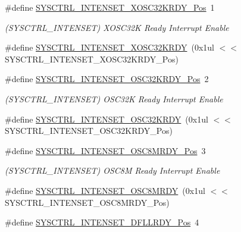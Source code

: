 \begin{DoxyCompactItemize}
\#define \mbox{\hyperlink{group___s_a_m_d21___s_y_s_c_t_r_l_ga25ddfd3f12446224bd6450f714ea657f}{S\+Y\+S\+C\+T\+R\+L\+\_\+\+I\+N\+T\+E\+N\+S\+E\+T\+\_\+\+X\+O\+S\+C32\+K\+R\+D\+Y\+\_\+\+Pos}}~1
\begin{DoxyCompactList}\small\item\em (S\+Y\+S\+C\+T\+R\+L\+\_\+\+I\+N\+T\+E\+N\+S\+ET) X\+O\+S\+C32K Ready Interrupt Enable \end{DoxyCompactList}\item 
\#define \mbox{\hyperlink{group___s_a_m_d21___s_y_s_c_t_r_l_gaa8d67982283af9b990f74ece463272e5}{S\+Y\+S\+C\+T\+R\+L\+\_\+\+I\+N\+T\+E\+N\+S\+E\+T\+\_\+\+X\+O\+S\+C32\+K\+R\+DY}}~(0x1ul $<$$<$ S\+Y\+S\+C\+T\+R\+L\+\_\+\+I\+N\+T\+E\+N\+S\+E\+T\+\_\+\+X\+O\+S\+C32\+K\+R\+D\+Y\+\_\+\+Pos)
\item 
\#define \mbox{\hyperlink{group___s_a_m_d21___s_y_s_c_t_r_l_ga3f9bba82c36ed4ec32060d60c257fabd}{S\+Y\+S\+C\+T\+R\+L\+\_\+\+I\+N\+T\+E\+N\+S\+E\+T\+\_\+\+O\+S\+C32\+K\+R\+D\+Y\+\_\+\+Pos}}~2
\begin{DoxyCompactList}\small\item\em (S\+Y\+S\+C\+T\+R\+L\+\_\+\+I\+N\+T\+E\+N\+S\+ET) O\+S\+C32K Ready Interrupt Enable \end{DoxyCompactList}\item 
\#define \mbox{\hyperlink{group___s_a_m_d21___s_y_s_c_t_r_l_gacc1b7e40094c57cbd01915685cb419c2}{S\+Y\+S\+C\+T\+R\+L\+\_\+\+I\+N\+T\+E\+N\+S\+E\+T\+\_\+\+O\+S\+C32\+K\+R\+DY}}~(0x1ul $<$$<$ S\+Y\+S\+C\+T\+R\+L\+\_\+\+I\+N\+T\+E\+N\+S\+E\+T\+\_\+\+O\+S\+C32\+K\+R\+D\+Y\+\_\+\+Pos)
\item 
\#define \mbox{\hyperlink{group___s_a_m_d21___s_y_s_c_t_r_l_ga9502d757aaecbe1575aa04c1c545dd22}{S\+Y\+S\+C\+T\+R\+L\+\_\+\+I\+N\+T\+E\+N\+S\+E\+T\+\_\+\+O\+S\+C8\+M\+R\+D\+Y\+\_\+\+Pos}}~3
\begin{DoxyCompactList}\small\item\em (S\+Y\+S\+C\+T\+R\+L\+\_\+\+I\+N\+T\+E\+N\+S\+ET) O\+S\+C8M Ready Interrupt Enable \end{DoxyCompactList}\item 
\#define \mbox{\hyperlink{group___s_a_m_d21___s_y_s_c_t_r_l_ga1d30c7a9319c94ad14d90cf590424586}{S\+Y\+S\+C\+T\+R\+L\+\_\+\+I\+N\+T\+E\+N\+S\+E\+T\+\_\+\+O\+S\+C8\+M\+R\+DY}}~(0x1ul $<$$<$ S\+Y\+S\+C\+T\+R\+L\+\_\+\+I\+N\+T\+E\+N\+S\+E\+T\+\_\+\+O\+S\+C8\+M\+R\+D\+Y\+\_\+\+Pos)
\item 
\#define \mbox{\hyperlink{group___s_a_m_d21___s_y_s_c_t_r_l_ga9ef357b6604f01292d19480b9c86ef2f}{S\+Y\+S\+C\+T\+R\+L\+\_\+\+I\+N\+T\+E\+N\+S\+E\+T\+\_\+\+D\+F\+L\+L\+R\+D\+Y\+\_\+\+Pos}}~4
$$
\end{DoxyCompactItemize}
